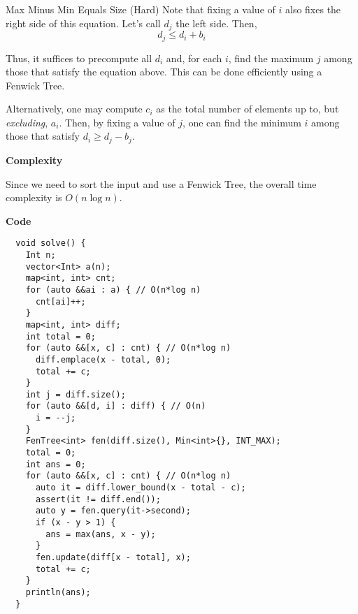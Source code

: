 \documentclass [11pt, a4paper] {article}
\begin{document}
\begin{tutorial}{Max Minus Min Equals Size (Hard)}
  Note that fixing a value of $i$ also fixes the right side of this equation. Let's call $d_j$ the left side. Then, $$ d_j \le d_i + b_i $$
  
  Thus, it suffices to precompute all $d_i$ and, for each $i$, find the maximum $j$ among those that satisfy the equation above. This can be done efficiently using a Fenwick Tree.
  
  Alternatively, one may compute $c_i$ as the total number of elements up to, but \textit{excluding}, $a_i$. Then, by fixing a value of $j$, one can find the minimum $i$ among those that satisfy $d_i \ge d_j - b_j$.
  
  \textbf{Complexity}
  
  Since we need to sort the input and use a Fenwick Tree, the overall time complexity is $O(n \log n)$.
  
  \textbf{Code}
  
  \begin{lstlisting}
  void solve() {
    Int n;
    vector<Int> a(n);
    map<int, int> cnt;
    for (auto &&ai : a) { // O(n*log n)
      cnt[ai]++;
    }
    map<int, int> diff;
    int total = 0;
    for (auto &&[x, c] : cnt) { // O(n*log n)
      diff.emplace(x - total, 0);
      total += c;
    }
    int j = diff.size();
    for (auto &&[d, i] : diff) { // O(n)
      i = --j;
    }
    FenTree<int> fen(diff.size(), Min<int>{}, INT_MAX);
    total = 0;
    int ans = 0;
    for (auto &&[x, c] : cnt) { // O(n*log n)
      auto it = diff.lower_bound(x - total - c);
      assert(it != diff.end());
      auto y = fen.query(it->second);
      if (x - y > 1) {
        ans = max(ans, x - y);
      }
      fen.update(diff[x - total], x);
      total += c;
    }
    println(ans);
  }
  \end{lstlisting}
  
\end{tutorial}
\end{document}
